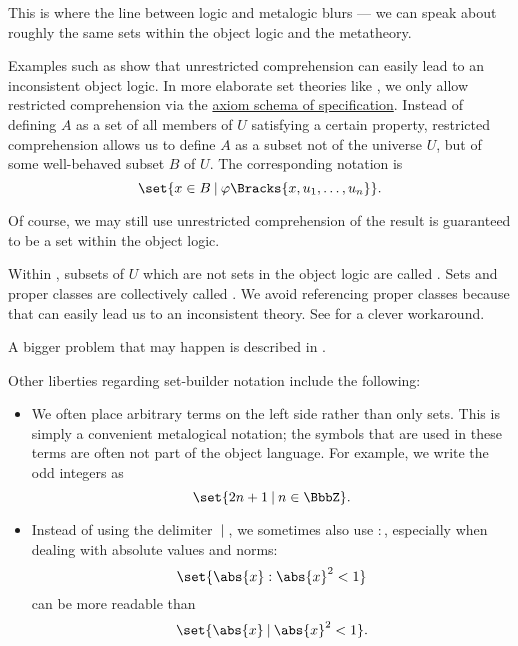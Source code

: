 \begin{definition}
  This is where the line between logic and metalogic blurs --- we can speak about roughly the same sets within the object logic and the metatheory.

  Examples such as  show that unrestricted comprehension can easily lead to an inconsistent object logic. In more elaborate set theories like \hyperref[def:zfc]{}, we only allow restricted comprehension via the \hyperref[def:zfc/specification]{axiom schema of specification}. Instead of defining \( A \) as a set of all members of \( U \) satisfying a certain property, restricted comprehension allows us to define \( A \) as a subset not of the universe \( U \), but of some well-behaved subset \( B \) of \( U \). The corresponding notation is
  \begin{equation*}
    \set{ x \in B \given \varphi\Bracks{x, u_1, \ldots, u_n} }.
  \end{equation*}

  Of course, we may still use unrestricted comprehension of the result is guaranteed to be a set within the object logic.

  Within , subsets of \( U \) which are not sets in the object logic are called . Sets and proper classes are collectively called . We avoid referencing proper classes because that can easily lead us to an inconsistent theory. See  for a clever workaround.

  A bigger problem that may happen is described in .

  Other liberties regarding set-builder notation include the following:
  \begin{itemize}
    \item We often place arbitrary terms on the left side rather than only sets. This is simply a convenient metalogical notation; the symbols that are used in these terms are often not part of the object language. For example, we write the odd integers as
    \begin{equation*}
      \set{ 2n + 1 \given n \in \BbbZ }.
    \end{equation*}

    \item Instead of using the delimiter \( \given \), we sometimes also use \( : \), especially when dealing with absolute values and norms:
    \begin{equation*}
      \set{ \abs{x} : \abs{x}^2 < 1 }
    \end{equation*}
    can be more readable than
    \begin{equation*}
      \set{ \abs{x} \given \abs{x}^2 < 1 }.
    \end{equation*}


\end{itemize}
\end{definition}
